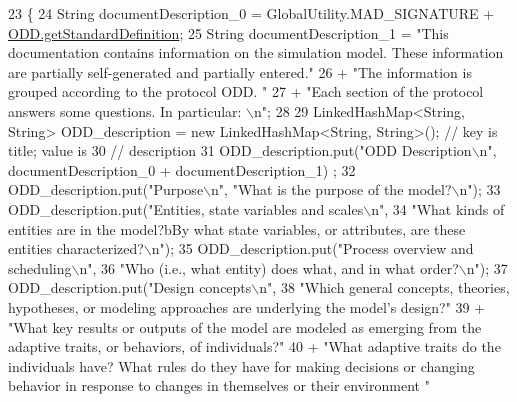 \begin{DoxyCode}
23                                                                    \{
24         String documentDescription\_0 = GlobalUtility.MAD\_SIGNATURE + 
      \hyperlink{classit_1_1isislab_1_1masonassisteddocumentation_1_1_o_d_d_1_1_o_d_d_a35a4a216476b294074ba15334011612e}{ODD.getStandardDefinition};
25         String documentDescription\_1 = \textcolor{stringliteral}{"This documentation contains information on the simulation model.
       These information are partially self-generated and partially entered."}
26                 + \textcolor{stringliteral}{"The information is grouped according to the protocol ODD. "}
27                 + \textcolor{stringliteral}{"Each section of the protocol answers some questions. In particular: \(\backslash\)n"};
28         
29         LinkedHashMap<String, String> ODD\_description = \textcolor{keyword}{new} LinkedHashMap<String, String>(); \textcolor{comment}{// key is
       title; value is}
30                                                         \textcolor{comment}{// description}
31         ODD\_description.put(\textcolor{stringliteral}{"ODD Description\(\backslash\)n"}, documentDescription\_0 + documentDescription\_1) ;
32         ODD\_description.put(\textcolor{stringliteral}{"Purpose\(\backslash\)n"}, \textcolor{stringliteral}{"What is the purpose of the model?\(\backslash\)n"});
33         ODD\_description.put(\textcolor{stringliteral}{"Entities, state variables and scales\(\backslash\)n"},
34                         \textcolor{stringliteral}{"What kinds of entities are in the model?bBy what state variables, or attributes,
       are these entities characterized?\(\backslash\)n"});
35         ODD\_description.put(\textcolor{stringliteral}{"Process overview and scheduling\(\backslash\)n"},
36                 \textcolor{stringliteral}{"Who (i.e., what entity) does what, and in what order?\(\backslash\)n"});
37         ODD\_description.put(\textcolor{stringliteral}{"Design concepts\(\backslash\)n"},
38                         \textcolor{stringliteral}{"Which general concepts, theories, hypotheses, or modeling approaches are
       underlying the model's design?"}
39                                 + \textcolor{stringliteral}{"What key results or outputs of the model are modeled as emerging from
       the adaptive traits, or behaviors, of individuals?"}
40                                 + \textcolor{stringliteral}{"What adaptive traits do the individuals have? What rules do they have
       for making decisions or changing behavior in response to changes in themselves or their environment "}

\end{DoxyCode}
